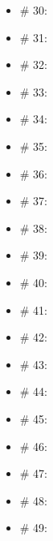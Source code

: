 \documentclass[dvipdfmx,autodetect-engine,10pt,b5paper,papersize,openany,dvipsnames]{jsbook}
\begin{document}
\begin{multicols}{3}
\begin{itemize}
  \item \# 30: \quad {}
  \item \# 31: \quad {}
  \item \# 32: \quad {}
  \item \# 33: \quad {}
  \item \# 34: \quad {}
  \item \# 35: \quad {}
  \item \# 36: \quad {}
  \item \# 37: \quad {}
  \item \# 38: \quad {}
  \item \# 39: \quad {}
\end{itemize}

\begin{itemize}
  \item \# 40: \quad {}
  \item \# 41: \quad {}
  \item \# 42: \quad {}
  \item \# 43: \quad {}
  \item \# 44: \quad {}
\end{itemize}

\end{multicols}

\begin{multicols}{2}

\begin{itemize}

\item \# 45: \quad {}
  \item \# 46: \quad {}
  \item \# 47: \quad {}
  \item \# 48: \quad {}
  \item \# 49: \quad {}
\end{itemize}

\end{multicols}
\end{document}
